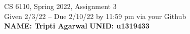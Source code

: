 \documentclass[11pt]{article}
\begin{document}

\newlength{\minpagw}
\settowidth{\minpagw}{\hspace{40em}}

\begin{center}
\begin{large}
  CS 6110, Spring 2022, Assignment 3  \\
  Given 2/3/22 -- Due 2/10/22 by 11:59 pm via your Github 
  \ \\
    {  {\Large\bf NAME: Tripti Agarwal} \hfill {\Large\bf UNID: u1319433 }\hspace{4cm} }
          \ \\
\end{large}

\end{center}
\end{document}
